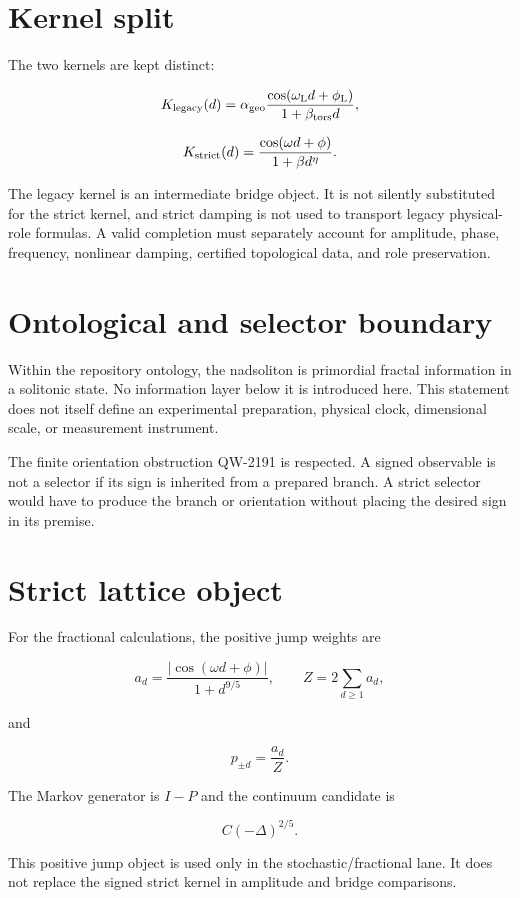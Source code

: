 \documentclass[11pt,a4paper,openany]{report}
\begin{document}
\section{Kernel split}

The two kernels are kept distinct:

\[
K_{\rm legacy}(d)
=
\alpha_{\rm geo}
\frac{\cos(\omega_{\rm L}d+\phi_{\rm L})}
{1+\beta_{\rm tors}d},
\]

\[
K_{\rm strict}(d)
=
\frac{\cos(\omega d+\phi)}
{1+\beta d^\eta}.
\]

The legacy kernel is an intermediate bridge object. It is not silently substituted for the strict kernel, and strict damping is not used to transport legacy physical-role formulas. A valid completion must separately account for amplitude, phase, frequency, nonlinear damping, certified topological data, and role preservation.

\section{Ontological and selector boundary}

Within the repository ontology, the nadsoliton is primordial fractal information in a solitonic state. No information layer below it is introduced here. This statement does not itself define an experimental preparation, physical clock, dimensional scale, or measurement instrument.

The finite orientation obstruction QW-2191 is respected. A signed observable is not a selector if its sign is inherited from a prepared branch. A strict selector would have to produce the branch or orientation without placing the desired sign in its premise.

\section{Strict lattice object}

For the fractional calculations, the positive jump weights are

\[
a_d=
\frac{|\cos(\omega d+\phi)|}{1+d^{9/5}},
\qquad
Z=2\sum_{d\ge1}a_d,
\]

and

\[
p_{\pm d}=\frac{a_d}{Z}.
\]

The Markov generator is \(I-P\) and the continuum candidate is

\[
C(-\Delta)^{2/5}.
\]

This positive jump object is used only in the stochastic/\allowbreak{}fractional lane. It does not replace the signed strict kernel in amplitude and bridge comparisons.
\end{document}
